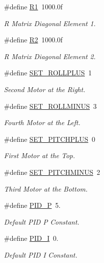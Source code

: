 \begin{DoxyCompactItemize}
\#define \hyperlink{group__config_ga918f64eb53db8e8dc694f36a87646476}{R1}~1000.\-0f
\begin{DoxyCompactList}\small\item\em R Matrix Diagonal Element 1. \end{DoxyCompactList}\item 
\#define \hyperlink{group__config_ga7a255a2815b9453060f51c6eb22cfed8}{R2}~1000.\-0f
\begin{DoxyCompactList}\small\item\em R Matrix Diagonal Element 2. \end{DoxyCompactList}\item 
\#define \hyperlink{group__config_ga460dbe0039d252579c5ce8beef7cc709}{S\-E\-T\-\_\-\-R\-O\-L\-L\-P\-L\-U\-S}~1
\begin{DoxyCompactList}\small\item\em Second Motor at the Right. \end{DoxyCompactList}\item 
\#define \hyperlink{group__config_ga9921670161925a1d7b946aeb65d5767a}{S\-E\-T\-\_\-\-R\-O\-L\-L\-M\-I\-N\-U\-S}~3
\begin{DoxyCompactList}\small\item\em Fourth Motor at the Left. \end{DoxyCompactList}\item 
\#define \hyperlink{group__config_gaf0a00d922db66d875ca53f6db34e7307}{S\-E\-T\-\_\-\-P\-I\-T\-C\-H\-P\-L\-U\-S}~0
\begin{DoxyCompactList}\small\item\em First Motor at the Top. \end{DoxyCompactList}\item 
\#define \hyperlink{group__config_ga8c969dbb07dc504226fc2c69484b9768}{S\-E\-T\-\_\-\-P\-I\-T\-C\-H\-M\-I\-N\-U\-S}~2
\begin{DoxyCompactList}\small\item\em Third Motor at the Bottom. \end{DoxyCompactList}\item 
\#define \hyperlink{group__config_gab3ea7c9a4399d8844727806c960880ad}{P\-I\-D\-\_\-\-P}~5.
\begin{DoxyCompactList}\small\item\em Default P\-I\-D P Constant. \end{DoxyCompactList}\item 
\#define \hyperlink{group__config_ga2dfd5fcf8dd0bee1de9007fe8e161886}{P\-I\-D\-\_\-\-I}~0.
\begin{DoxyCompactList}\small\item\em Default P\-I\-D I Constant. \end{DoxyCompactList}\item 

\end{DoxyCompactItemize}
